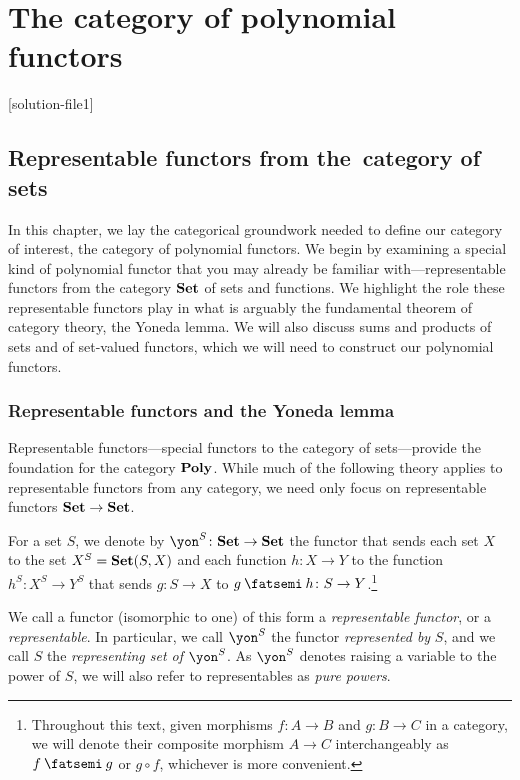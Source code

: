 \documentclass[Book-Poly]{subfiles}
\begin{document}
\setcounter{chapter}{0}%

\part{The category of polynomial functors}\label{part.poly}


[solution-file1]

\chapter{Representable functors from the~category of sets} \label{ch.poly.rep-sets}

In this chapter, we lay the categorical groundwork needed to define our category of interest, the category of polynomial functors.
We begin by examining a special kind of polynomial functor that you may already be familiar with---representable functors from the category $\mathbf{Set}$ of sets and functions.
We highlight the role these representable functors play in what is arguably the fundamental theorem of category theory, the Yoneda lemma.
We will also discuss sums and products of sets and of set-valued functors, which we will need to construct our polynomial functors.

\section{Representable functors and the Yoneda lemma} \label{sec.poly.rep-sets.yon}

Representable functors---special functors to the category of sets---provide the foundation for the category $\mathbf{Poly}$.
While much of the following theory applies to representable functors from any category, we need only focus on representable functors $\mathbf{Set}\to\mathbf{Set}$.

\begin{definition} \label{def.representable}
    For a set $S$, we denote by $\yon^S\colon\smset\to\smset$ the functor that sends each set $X$ to the set $X^S=\mathbf{Set}(S,X)$ and each function $h\colon X\to Y$ to the function $h^S\colon X^S\to Y^S$ that sends $g\colon S\to X$ to $g\then h\colon S\to Y$.\footnote{Throughout this text, given morphisms $f \colon A \to B$ and $g \colon B \to C$ in a category, we will denote their composite morphism $A \to C$ interchangeably as $f \then g$ or $g \circ f$, whichever is more convenient.}

    We call a functor (isomorphic to one) of this form a \emph{representable functor}, or a \emph{representable}.
    In particular, we call $\yon^S$ the functor \emph{represented by} $S$, and we call $S$ the \emph{representing set of $\yon^S$}.
    As $\yon^S$ denotes raising a variable to the power of $S$, we will also refer to representables as \emph{pure powers}.
\end{definition}
\end{document}
